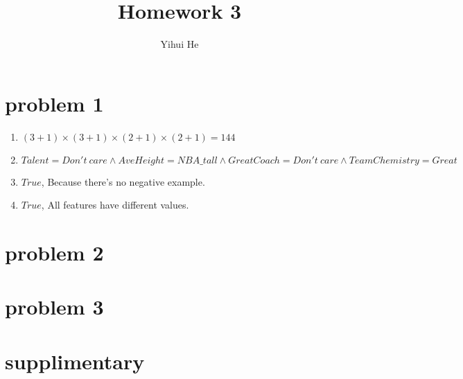 \documentclass[a4paper, 12pt]{article}
\title{Homework 3}
\author{Yihui He}
\affil{\href{mailto:yihuihe@fomail.com}{yihuihe@fomail.com}}
\begin{document}
\maketitle
\tableofcontents
\section{problem 1}
\begin{enumerate}[label=(\alph*)]
\item $(3+1)\times(3+1)\times(2+1)\times(2+1)=144$
\item $Talent=Don't\ care\wedge AveHeight=NBA\_tall\wedge GreatCoach=Don't\ care\wedge TeamChemistry=Great$
\item $True$, Because there's no negative example.
\item $True$, All features have different values.
\end{enumerate}

\section{problem 2}

\section{problem 3}

\section{supplimentary}

\end{document}
